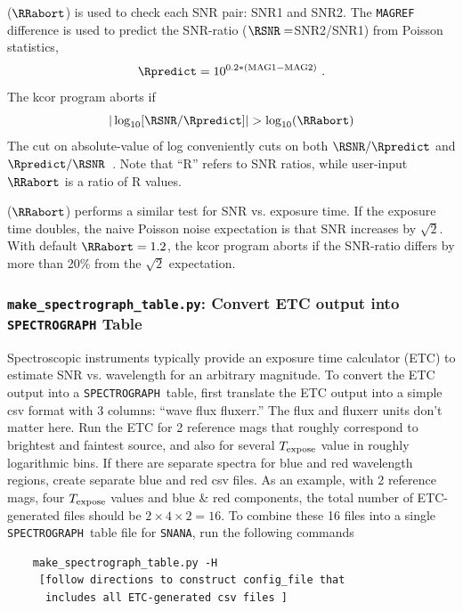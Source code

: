\documentclass[12pt]{article}
\newcommand{\SPEC}{{\tt SPECTROGRAPH}}
\newcommand{\Texpose}{T_{\rm expose}}
\newcommand{\SNANA}{{\tt SNANA}}
\begin{document}
{ 
($\RRabort$) is used to check each SNR pair: SNR1 and SNR2. 
The {\tt MAGREF} difference is used to predict the
SNR-ratio ($\RSNR=$SNR2/SNR1) from Poisson statistics,
%
\begin{equation}
  \Rpredict = 10^{0.2*({\rm MAG1}-{\rm MAG2})} ~.
\end{equation}
%
The kcor program aborts if
\begin{equation}
  \vert \log_{10}[\RSNR/\Rpredict] \vert  > \log_{10}(\RRabort)
\end{equation}
%
The cut on absolute-value of log conveniently cuts on both
$\RSNR/\Rpredict$ and $\Rpredict/\RSNR$~.
Note that ``R'' refers to SNR ratios, while user-input 
$\RRabort$ is a ratio of R values.

\bigskip
{}
($\RRabort$)
performs a similar test for SNR vs. exposure time. 
If the exposure time doubles, the naive Poisson noise expectation
is that SNR increases by $\sqrt{2}$.
With default $\RRabort=1.2$, the kcor program aborts if
the SNR-ratio differs by more than 20\% from the
$\sqrt{2}$ expectation.


\newcommand{\makeSpec}{{\tt make\_spectrograph\_table.py}}
\subsubsection{{\makeSpec}: Convert ETC output into {\SPEC} Table }

Spectroscopic instruments typically provide an exposure time calculator (ETC)
to estimate SNR vs. wavelength for an arbitrary magnitude. To convert the ETC
output into a \SPEC\ table, first translate the ETC output into a simple
csv format with 3 columns: ``wave flux fluxerr.'' 
The flux and fluxerr units don't matter here.
Run the ETC for 2 reference mags that roughly correspond to brightest and
faintest source, and also for several $\Texpose$ value in roughly logarithmic bins.
If there are separate spectra for blue and red wavelength regions,
create separate blue and red csv files. As an example, with 2 reference mags,
four $\Texpose$ values and blue \& red components, 
the total number of ETC-generated
files should be $2\times 4\times 2 = 16$.
To combine these 16 files into a single \SPEC\ table file for \SNANA,
run the following commands
\begin{verbatim}
    make_spectrograph_table.py -H
     [follow directions to construct config_file that 
      includes all ETC-generated csv files ]


\end{verbatim}}
\end{document}
